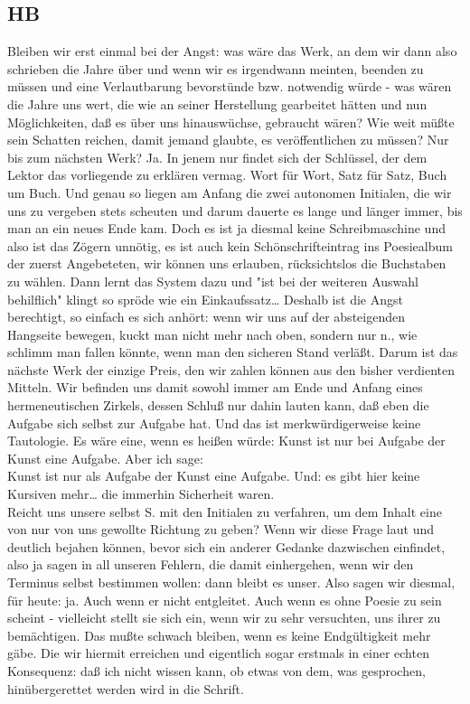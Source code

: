 \documentclass[
]{article}
\author{}
\date{\vspace{-2.5em}}
\begin{document}
\subsection{HB}\label{hb}

Bleiben wir erst einmal bei der Angst: was wäre das Werk, an dem wir
dann also schrieben die Jahre über und wenn wir es irgendwann meinten,
beenden zu müssen und eine Verlautbarung bevorstünde bzw. notwendig
würde - was wären die Jahre uns wert, die wie an seiner Herstellung
gearbeitet hätten und nun Möglichkeiten, daß es über uns hinauswüchse,
gebraucht wären? Wie weit müßte sein Schatten reichen, damit jemand
glaubte, es veröffentlichen zu müssen? Nur bis zum nächsten Werk? Ja. In
jenem nur findet sich der Schlüssel, der dem Lektor das vorliegende zu
erklären vermag. Wort für Wort, Satz für Satz, Buch um Buch. Und genau
so liegen am Anfang die zwei autonomen Initialen, die wir uns zu
vergeben stets scheuten und darum dauerte es lange und länger immer, bis
man an ein neues Ende kam. Doch es ist ja diesmal keine Schreibmaschine
und also ist das Zögern unnötig, es ist auch kein Schönschrifteintrag
ins Poesiealbum der zuerst Angebeteten, wir können uns erlauben,
rücksichtslos die Buchstaben zu wählen. Dann lernt das System dazu und
"ist bei der weiteren Auswahl behilflich" klingt so spröde wie ein
Einkaufssatz\ldots{} Deshalb ist die Angst berechtigt, so einfach es
sich anhört: wenn wir uns auf der absteigenden Hangseite bewegen, kuckt
man nicht mehr nach oben, sondern nur n., wie schlimm man fallen könnte,
wenn man den sicheren Stand verläßt. Darum ist das nächste Werk der
einzige Preis, den wir zahlen können aus den bisher verdienten Mitteln.
Wir befinden uns damit sowohl immer am Ende und Anfang eines
hermeneutischen Zirkels, dessen Schluß nur dahin lauten kann, daß eben
die Aufgabe sich selbst zur Aufgabe hat. Und das ist merkwürdigerweise
keine Tautologie. Es wäre eine, wenn es heißen würde: Kunst ist nur bei
Aufgabe der Kunst eine Aufgabe. Aber ich sage:\\
Kunst ist nur als Aufgabe der Kunst eine Aufgabe. Und: es gibt hier
keine Kursiven mehr\ldots{} die immerhin Sicherheit waren.\\
Reicht uns unsere selbst S. mit den Initialen zu verfahren, um dem
Inhalt eine von nur von uns gewollte Richtung zu geben? Wenn wir diese
Frage laut und deutlich bejahen können, bevor sich ein anderer Gedanke
dazwischen einfindet, also ja sagen in all unseren Fehlern, die damit
einhergehen, wenn wir den Terminus selbst bestimmen wollen: dann bleibt
es unser. Also sagen wir diesmal, für heute: ja. Auch wenn er nicht
entgleitet. Auch wenn es ohne Poesie zu sein scheint - vielleicht stellt
sie sich ein, wenn wir zu sehr versuchten, uns ihrer zu bemächtigen. Das
mußte schwach bleiben, wenn es keine Endgültigkeit mehr gäbe. Die wir
hiermit erreichen und eigentlich sogar erstmals in einer echten
Konsequenz: daß ich nicht wissen kann, ob etwas von dem, was gesprochen,
hinübergerettet werden wird in die Schrift.
\end{document}
